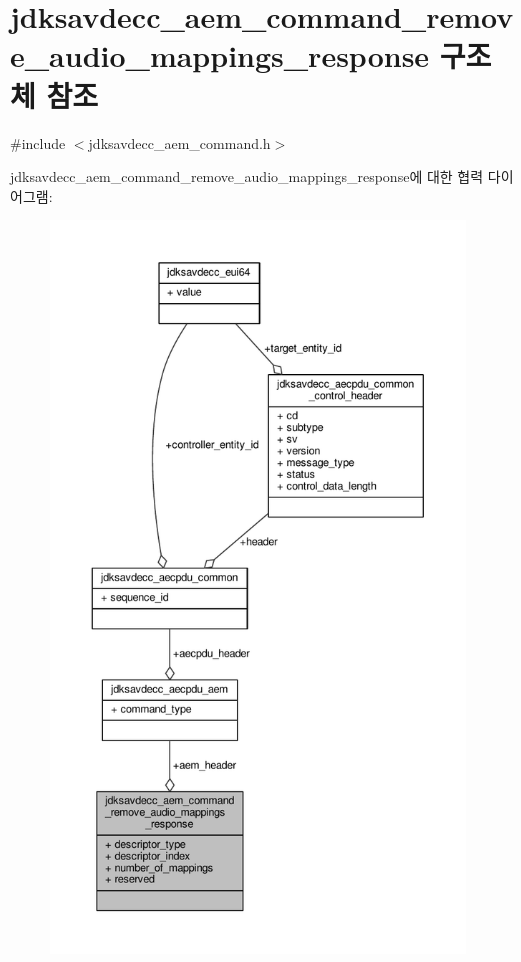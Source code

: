\hypertarget{structjdksavdecc__aem__command__remove__audio__mappings__response}{}\section{jdksavdecc\+\_\+aem\+\_\+command\+\_\+remove\+\_\+audio\+\_\+mappings\+\_\+response 구조체 참조}
\label{structjdksavdecc__aem__command__remove__audio__mappings__response}


{\ttfamily \#include $<$jdksavdecc\+\_\+aem\+\_\+command.\+h$>$}



jdksavdecc\+\_\+aem\+\_\+command\+\_\+remove\+\_\+audio\+\_\+mappings\+\_\+response에 대한 협력 다이어그램\+:
\nopagebreak
\begin{figure}[H]
\begin{center}
\leavevmode
\includegraphics[height=550pt]{structjdksavdecc__aem__command__remove__audio__mappings__response__coll__graph}
\end{center}
\end{figure}
